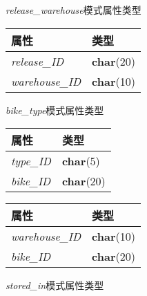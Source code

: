 \begin{figure}[!htp]
    \begin{minipage}{0.3\textwidth}
      \centering
      \caption{\textit{release\_warehouse}模式属性类型}
      \label{tab:releasewarehouse}
      \begin{tabular}{ll}\toprule
        属性&类型\\\midrule
       \textit{release\_ID}&\textbf{char}(20)\\
       \textit{warehouse\_ID}&\textbf{char}(10)\\
       \bottomrule
      \end{tabular}
    \end{minipage}\hfill
    \begin{minipage}{0.3\textwidth}
      \centering
      \caption{\textit{bike\_type}模式属性类型}
      \label{tab:biketype}
      \begin{tabular}{ll}\toprule
        属性&类型\\\midrule
       \textit{type\_ID}&\textbf{char}(5)\\
       \textit{bike\_ID}&\textbf{char}(20)\\
       \bottomrule
      \end{tabular}
    \end{minipage}\hfill
    \begin{minipage}{0.3\textwidth}
      \centering
      \caption{\textit{stored\_in}模式属性类型}
      \label{tab:storedin}
      \begin{tabular}{ll}\toprule
        属性&类型\\\midrule
       \textit{warehouse\_ID}&\textbf{char}(10)\\
       \textit{bike\_ID}&\textbf{char}(20)\\
       \bottomrule
      \end{tabular}
    \end{minipage}\hfill
  \end{figure}

